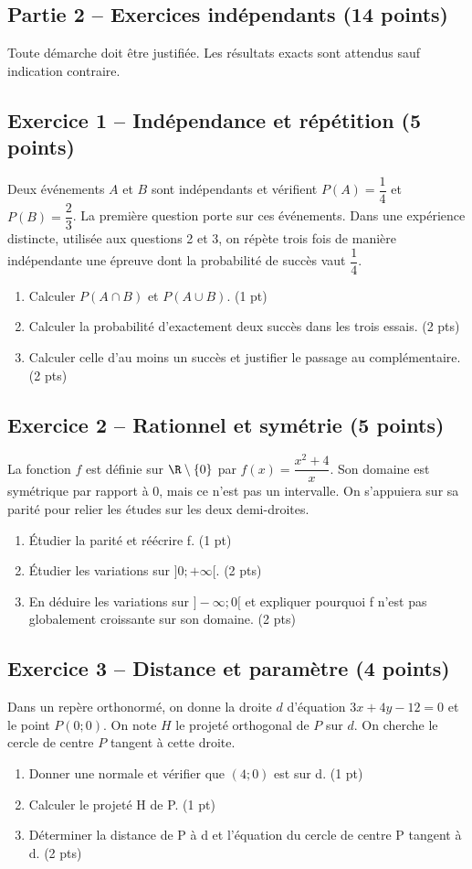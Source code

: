 \clearpage\subsection*{Partie 2 -- Exercices indépendants (14 points)}
Toute démarche doit être justifiée. Les résultats exacts sont attendus sauf indication contraire.
\subsection*{Exercice 1 -- Indépendance et répétition (5 points)}
Deux événements $A$ et $B$ sont indépendants et vérifient $P(A)=\dfrac14$ et $P(B)=\dfrac23$. La première question porte sur ces événements. Dans une expérience distincte, utilisée aux questions 2 et 3, on répète trois fois de manière indépendante une épreuve dont la probabilité de succès vaut $\dfrac14$.
\begin{enumerate}
\item Calculer $P(A\cap B)$ et $P(A\cup B)$. \hfill(1 pt)
\item Calculer la probabilité d’exactement deux succès dans les trois essais. \hfill(2 pts)
\item Calculer celle d’au moins un succès et justifier le passage au complémentaire. \hfill(2 pts)
\end{enumerate}
\subsection*{Exercice 2 -- Rationnel et symétrie (5 points)}
La fonction $f$ est définie sur $\R\setminus\{0\}$ par $f(x)=\dfrac{x^2+4}{x}$. Son domaine est symétrique par rapport à 0, mais ce n’est pas un intervalle. On s’appuiera sur sa parité pour relier les études sur les deux demi-droites.
\begin{enumerate}
\item Étudier la parité et réécrire f. \hfill(1 pt)
\item Étudier les variations sur $]0;+\infty[$. \hfill(2 pts)
\item En déduire les variations sur $]-\infty;0[$ et expliquer pourquoi f n’est pas globalement croissante sur son domaine. \hfill(2 pts)
\end{enumerate}
\subsection*{Exercice 3 -- Distance et paramètre (4 points)}
Dans un repère orthonormé, on donne la droite $d$ d’équation $3x+4y-12=0$ et le point $P(0;0)$. On note $H$ le projeté orthogonal de $P$ sur $d$. On cherche le cercle de centre $P$ tangent à cette droite.
\begin{enumerate}
\item Donner une normale et vérifier que $(4;0)$ est sur d. \hfill(1 pt)
\item Calculer le projeté H de P. \hfill(1 pt)
\item Déterminer la distance de P à d et l’équation du cercle de centre P tangent à d. \hfill(2 pts)
\end{enumerate}
